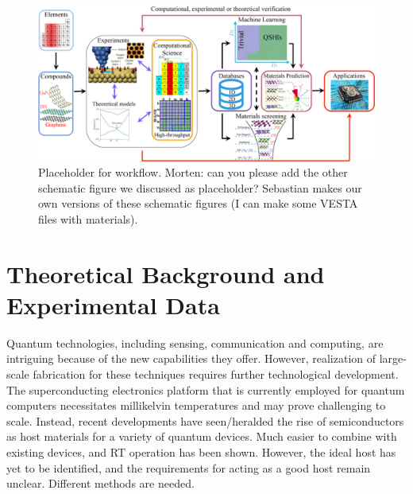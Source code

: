 \documentclass[superscriptaddress,unsortedaddress,
 amsmath,amssymb,
 aps,
]{revtex4-2}
\begin{document}
\begin{figure}
    \centering
    \includegraphics[width=\textwidth]{figures/ht-workflow.jpg}
    \caption{Placeholder for workflow. Morten: can you please add the other schematic figure we discussed as placeholder? Sebastian makes our own versions of these schematic figures (I can make some VESTA files with materials). }
    \label{fig:ht-workflow}
\end{figure}

\section*{Theoretical Background and Experimental Data} 
Quantum technologies, including sensing, communication and computing, 
are intriguing because of the new capabilities they offer. 
However, realization of large-scale fabrication for these techniques requires further technological development. 
The superconducting electronics platform that is currently employed for quantum computers necessitates millikelvin temperatures and may prove challenging to scale. 
Instead, recent developments have seen/heralded the rise of semiconductors as host materials for a variety of quantum devices. Much easier to combine with existing devices, and RT operation has been shown. 
However, the ideal host has yet to be identified, and the requirements for acting as a good host remain unclear. 
Different methods are needed. 
\end{document}
